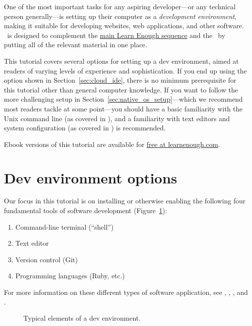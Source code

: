 
\noindent One of the most important tasks for any aspiring developer---or any technical person generally---is setting up their computer as a \emph{development environment}, making it suitable for developing websites, web applications, and other software. \ledev\ is designed to complement the \href{https://www.learnenough.com/}{main Learn Enough sequence} and the \rort\ by putting all of the relevant material in one place.

This tutorial covers several options for setting up a dev environment, aimed at readers of varying levels of experience and sophistication. If you end up using the option shown in Section~\ref{sec:cloud_ide}, there is no minimum prerequisite for this tutorial other than general computer knowledge. If you want to follow the more challenging setup in Section~\ref{sec:native_os_setup}---which we recommend most readers tackle at some point---you should have a basic familiarity with the Unix command line (as covered in \lecl), and a familiarity with text editors and system configuration (as covered in ) is recommended.

Ebook versions of this tutorial are available for \href{https://www.learnenough.com/dev-environment}{free at learnenough.com}.

\section{Dev environment options} %
\label{sec:dev_environment_options}

Our focus in this tutorial is on installing or otherwise enabling the following four fundamental tools of software development (Figure~\ref{fig:dev_environment}):
\begin{enumerate}
  \item Command-line terminal (``shell'')
  \item Text editor
  \item Version control (Git)
  \item Programming languages (Ruby, etc.)
\end{enumerate}
For more information on these different types of software application, see \lecl, , \leg, and \ler.

\begin{figure}
\begin{center}
\end{center}
\caption{Typical elements of a dev environment.\label{fig:dev_environment}}
\end{figure}

